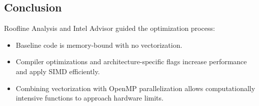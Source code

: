 \subsection{Conclusion}

Roofline Analysis and Intel Advisor guided the optimization process:

\begin{itemize}
    \item Baseline code is memory-bound with no vectorization.
    \item Compiler optimizations and architecture-specific flags increase performance and apply SIMD efficiently.
    \item Combining vectorization with OpenMP parallelization allows computationally intensive functions to approach hardware limits.
\end{itemize}

